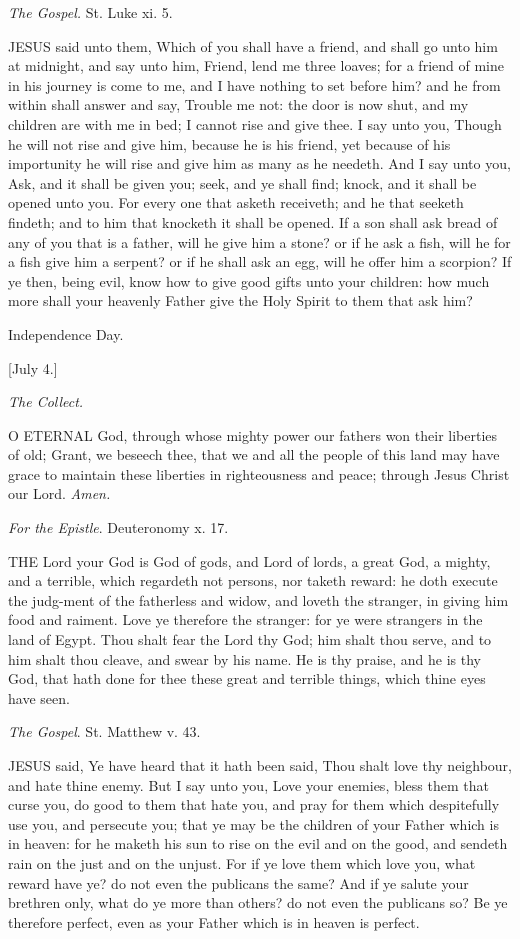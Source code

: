 \emph{The Gospel.} St. Luke xi. 5.

JESUS said unto them, Which
of you shall have a friend, and shall go unto him at midnight, and say
unto him, Friend, lend me three loaves; for a friend of mine in his journey
is come to me, and I have nothing to set before him? and he from within
shall answer and say, Trouble me not: the door is now shut, and my children
are with me in bed; I cannot rise and give thee. I say unto you, Though
he will not rise and give him, because he is his friend, yet because of
his importunity he will rise and give him as many as he needeth. And I
say unto you, Ask, and it shall be given you; seek, and ye shall find;
knock, and it shall be opened unto you. For every one that asketh receiveth;
and he that seeketh findeth; and to him that knocketh it shall be opened.
If a son shall ask bread of any of you that is a father, will he give
him a stone? or if he ask a fish, will he for a fish give him a serpent?
or if he shall ask an egg, will he offer him a scorpion? If ye then, being
evil, know how to give good gifts unto your children: how much more shall
your heavenly Father give the Holy Spirit to them that ask him?

Independence Day.

[July 4.]

\emph{The Collect.}

O
ETERNAL God, through whose mighty power our fathers won their liberties
of old; Grant, we beseech thee, that we and all the people of this land
may have grace to maintain these liberties in righteousness and peace;
through Jesus Christ our Lord. \emph{Amen.}

\emph{For the Epistle}. Deuteronomy x. 17.

THE Lord your God is God
of gods, and Lord of lords, a great God, a mighty, and a terrible, which
regardeth not persons, nor taketh reward: he doth execute the judg-ment
of the fatherless and widow, and loveth the stranger, in giving him food
and raiment. Love ye therefore the stranger: for ye were strangers in
the land of Egypt. Thou shalt fear the Lord thy God; him shalt thou serve,
and to him shalt thou cleave, and swear by his name. He is thy praise,
and he is thy God, that hath done for thee these great and terrible things,
which thine eyes have seen.

\emph{The Gospel}. St. Matthew v. 43.

JESUS said, Ye have heard
that it hath been said, Thou shalt love thy neighbour, and hate thine
enemy. But I say unto you, Love your enemies, bless them that curse you,
do good to them that hate you, and pray for them which despitefully use
you, and persecute you; that ye may be the children of your Father which
is in heaven: for he maketh his sun to rise on the evil and on the good,
and sendeth rain on the just and on the unjust. For if ye love them which
love you, what reward have ye? do not even the publicans the same? And
if ye salute your brethren only, what do ye more than others? do not even
the publicans so? Be ye therefore perfect, even as your Father which is
in heaven is perfect.

